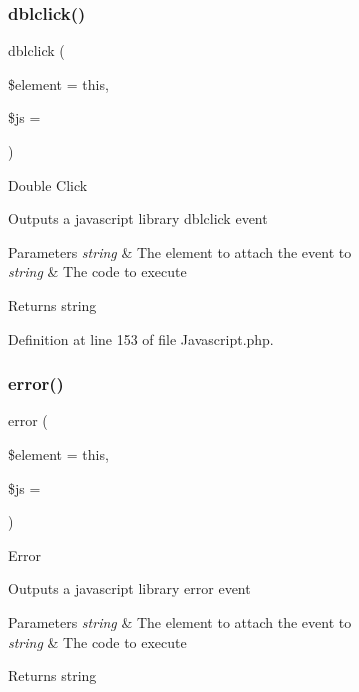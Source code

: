 \subsubsection{\texorpdfstring{dblclick()}{dblclick()}}
{\footnotesize\ttfamily dblclick (\begin{DoxyParamCaption}\item[{}]{\$element = {\ttfamily \textquotesingle{}this\textquotesingle{}},  }\item[{}]{\$js = {\ttfamily \textquotesingle{}\textquotesingle{}} }\end{DoxyParamCaption})}

Double Click

Outputs a javascript library dblclick event


\begin{DoxyParams}{Parameters}
{\em string} & The element to attach the event to \\
\hline
{\em string} & The code to execute \\
\hline
\end{DoxyParams}
\begin{DoxyReturn}{Returns}
string 
\end{DoxyReturn}


Definition at line 153 of file Javascript.\+php.

\mbox{\label{class_c_i___javascript_ac6c4977af5ec27a5addbb3b2a28912e2}} 
\subsubsection{\texorpdfstring{error()}{error()}}
{\footnotesize\ttfamily error (\begin{DoxyParamCaption}\item[{}]{\$element = {\ttfamily \textquotesingle{}this\textquotesingle{}},  }\item[{}]{\$js = {\ttfamily \textquotesingle{}\textquotesingle{}} }\end{DoxyParamCaption})}

Error

Outputs a javascript library error event


\begin{DoxyParams}{Parameters}
{\em string} & The element to attach the event to \\
\hline
{\em string} & The code to execute \\
\hline
\end{DoxyParams}
\begin{DoxyReturn}{Returns}
string 
\end{DoxyReturn}


